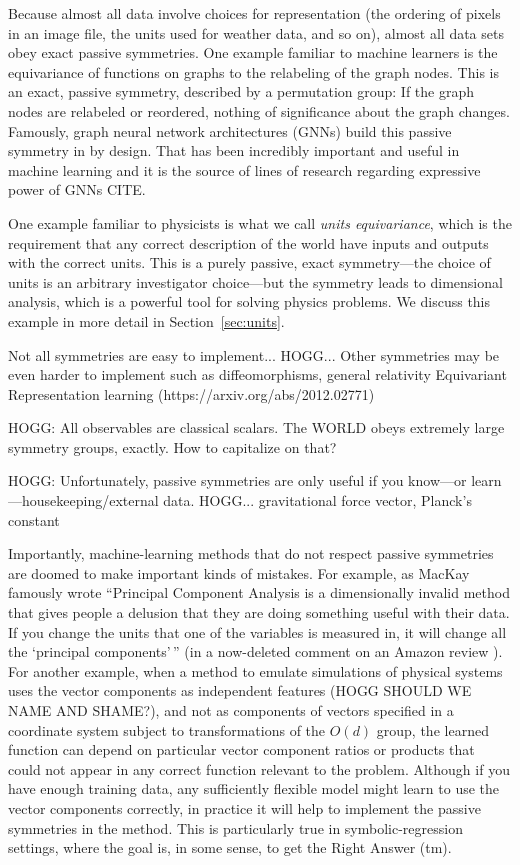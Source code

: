 \documentclass{article}
\theoremstyle{plain}
\theoremstyle{definition}
\theoremstyle{remark}
\newcommand{\sectionname}{Section}
\newcommand{\secref}[1]{\sectionname~\ref{#1}}
\begin{document}
Because almost all data involve choices for representation (the ordering of pixels in an image file, the units used for weather data, and so on), almost all data sets obey exact passive symmetries.
One example familiar to machine learners is the equivariance of functions on graphs to the relabeling of the graph nodes.
This is an exact, passive symmetry, described by a permutation group:
If the graph nodes are relabeled or reordered, nothing of significance about the graph changes.
Famously, graph neural network architectures (GNNs) build this passive symmetry in by design.
That has been incredibly important and useful in machine learning and it is the source of lines of research regarding expressive power of GNNs CITE.

One example familiar to physicists is what we call \emph{units equivariance}, which is the requirement that any correct description of the world have inputs and outputs with the correct units.
This is a purely passive, exact symmetry---the choice of units is an arbitrary investigator choice---but the symmetry leads to dimensional analysis, which is a powerful tool for solving physics problems.
We discuss this example in more detail in \secref{sec:units}.

Not all symmetries are easy to implement... HOGG... Other symmetries may be even harder to implement such as diffeomorphisms, general relativity
Equivariant Representation learning (https://arxiv.org/abs/2012.02771)
   
HOGG: All observables are classical scalars. The WORLD obeys extremely large symmetry groups, exactly. How to capitalize on that?

HOGG: Unfortunately, passive symmetries are only useful if you know---or learn---housekeeping/external data. HOGG... gravitational force vector, Planck's constant

Importantly, machine-learning methods that do not respect passive symmetries are doomed to make important kinds of mistakes.
For example, as MacKay famously wrote ``Principal Component Analysis is a dimensionally invalid method that gives people a delusion that they are doing something useful with their data. If you change the units that one of the variables is measured in, it will change all the `principal components'\,'' (in a now-deleted comment on an Amazon review \citealt{muldoonmediumpost}).
For another example, when a method to emulate simulations of physical systems uses the vector components as independent features (HOGG SHOULD WE NAME AND SHAME?), and not as components of vectors specified in a coordinate system subject to transformations of the $O(d)$ group, the learned function can depend on particular vector component ratios or products that could not appear in any correct function relevant to the problem.
Although if you have enough training data, any sufficiently flexible model might learn to use the vector components correctly, in practice it will help to implement the passive symmetries in the method.
This is particularly true in symbolic-regression settings, where the goal is, in some sense, to get the Right Answer (tm).
\end{document}
